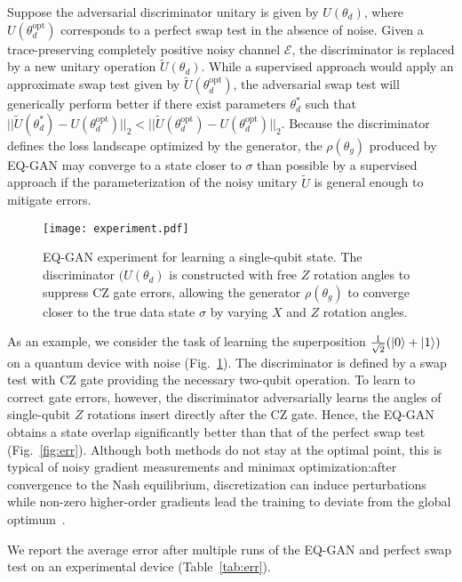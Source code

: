 \documentclass[prl,superscriptaddress,twocolumn]{revtex4}
\makeatletter
\newcommand{\sket}[1]{{\ensuremath{\lvert#1\rangle}}}
\newcommand{\lket}[1]{{\ensuremath{\left\lvert#1\right\rangle}}}
\newcommand{\ket}[1]{\if@display\lket{#1}\else\sket{#1}\fi}
\theoremstyle{plain}
\theoremstyle{definition}
\makeatother
\begin{document}
Suppose the adversarial discriminator unitary is given by $U(\theta_d)$, where $U(\theta_d^\mathrm{opt})$ corresponds to a perfect swap test in the absence of noise. Given a trace-preserving completely positive noisy channel $\mathcal{E}$, the discriminator is replaced by a new unitary operation $\tilde U(\theta_d)$. While a supervised approach would apply an approximate swap test given by $\tilde U(\theta_d^\mathrm{opt})$, the adversarial swap test will generically perform better if there exist parameters $\theta^*_d$ such that $||\tilde U(\theta^*_d) -  U(\theta_d^\mathrm{opt})||_2 < || \tilde U(\theta_d^\mathrm{opt}) - U(\theta_d^\mathrm{opt})||_2$. Because the discriminator defines the loss landscape optimized by the generator, the $\rho(\theta_g)$ produced by EQ-GAN may converge to a state closer to $\sigma$ than possible by a supervised approach if the parameterization of the noisy unitary $\tilde U$ is general enough to mitigate errors.

\begin{figure}[h!]
\begin{center}
\texttt{[image: experiment.pdf]}
\caption{EQ-GAN experiment for learning a single-qubit state. The discriminator $(U(\theta_d)$ is constructed with free $Z$ rotation angles to suppress CZ gate errors, allowing the generator $\rho(\theta_g)$ to converge closer to the true data state $\sigma$ by varying $X$ and $Z$ rotation angles.}
\label{fig:experiment}
\end{center}
\end{figure}

As an example, we consider the task of learning the superposition $\frac{1}{\sqrt{2}}(\ket{0} + \ket{1})$ on a quantum device with noise (Fig.~\ref{fig:experiment}). The discriminator is defined by a swap test with CZ gate providing the necessary two-qubit operation. To learn to correct gate errors, however, the discriminator adversarially learns the angles of single-qubit $Z$ rotations insert directly after the CZ gate. Hence, the EQ-GAN obtains a state overlap significantly better than that of the perfect swap test (Fig.~\ref{fig:err}). Although both methods do not stay at the optimal point, this is typical of noisy gradient measurements and minimax optimization:after convergence to the Nash equilibrium, discretization can induce perturbations while non-zero higher-order gradients lead the training to deviate from the global optimum~\cite{brock2018large}.

We report the average error after multiple runs of the EQ-GAN and perfect swap test on an experimental device (Table~\ref{tab:err}).
\end{document}
